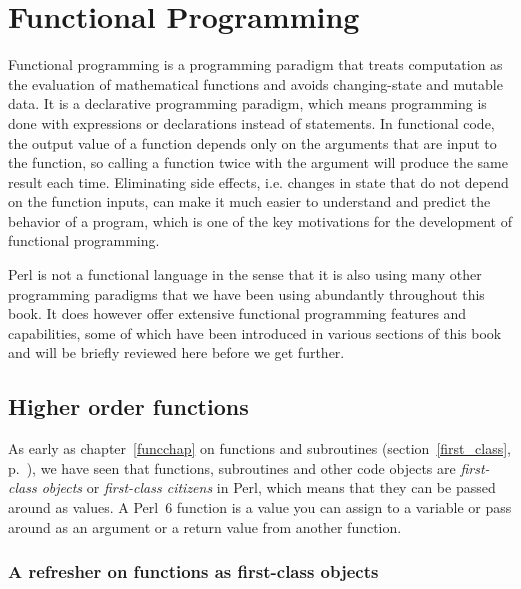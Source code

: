 \chapter{Functional Programming}
\label{functional programming}

Functional programming is a programming paradigm that treats 
computation as the evaluation of mathematical functions 
and avoids changing-state and mutable data. It is a 
declarative programming paradigm, which means programming 
is done with expressions or declarations instead of 
statements. In functional code, the output value of a function 
depends only on the arguments that are input to the function, 
so calling a function twice with the argument will produce the 
same result each time. Eliminating side effects, i.e. changes 
in state that do not depend on the function inputs, can make 
it much easier to understand and predict the behavior of a 
program, which is one of the key motivations for the 
development of functional programming.

Perl is not a functional language in the sense that it is 
also using many other programming paradigms that we have been 
using abundantly throughout this book. It does however 
offer extensive functional programming features and 
capabilities, some of which have been introduced in 
various sections of this book and will be briefly 
reviewed here before we get further.

\section{Higher order functions}

As early as chapter~\ref{funcchap} on functions and 
subroutines (section~\ref{first_class}, 
p.~\pageref{first_class}), we have seen that functions,  
subroutines and other code objects are \emph{first-class 
objects} or \emph{first-class citizens} in Perl, which 
means that they can be passed around as values. A Perl~6 
function is a value you can assign to a variable or pass 
around as an argument or a return value from another 
function.

\subsection{A refresher on functions as first-class objects}
\label{fco-refresher}

